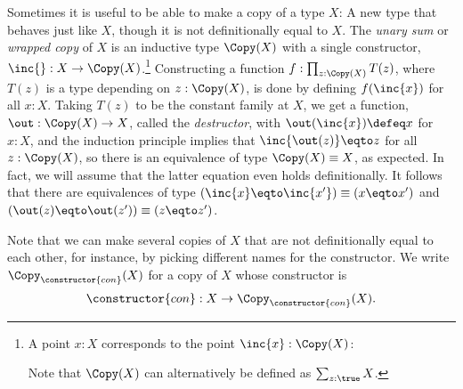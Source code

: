 Sometimes it is useful to be able to make a copy of a type $X$:
A new type that behaves just like $X$,
though it is not definitionally equal to $X$.
The \emph{unary sum} or \emph{wrapped copy} of $X$ is an inductive type $\Copy(X)$
with a single constructor, $\inc{} : X \to \Copy(X)$.\footnote{%
  A point $x:X$ corresponds to the point $\inc{x}:\Copy(X)$:\par
  \par
  \noindent Note that $\Copy(X)$ can alternatively be defined as $\sum_{z:\true}X$.}
Constructing a function $f : \prod_{z:\Copy(X)}T(z)$,
where $T(z)$ is a type depending on $z : \Copy(X)$,
is done by defining $f(\inc{x})$ for all $x:X$.
Taking $T(z)$ to be the constant family at $X$,
we get a function, $\out : \Copy(X) \to X$,
called the \emph{destructor},
with $\out(\inc{x}) \defeq x$ for $x:X$,
and the induction principle implies that $\inc{\out(z)} \eqto z$
for all $z:\Copy(X)$, so there is an equivalence of type $\Copy(X) \equiv X$, as expected.
In fact, we will assume that the latter equation even holds definitionally.
It follows that there are equivalences of type $(\inc{x} \eqto \inc{x'}) \equiv (x \eqto x')$ and $(\out(z) \eqto \out(z')) \equiv (z \eqto z')$.

Note that we can make several copies of $X$ that are not
definitionally equal to each other,
for instance, by picking different names for the constructor.
We write $\Copy_{\constructor{con}}(X)$ for a copy of $X$
whose constructor is
\[
  \constructor{con} : X \to \Copy_{\constructor{con}}(X).
\]

